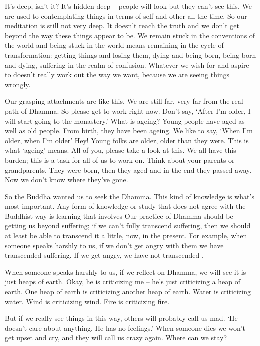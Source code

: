 It's deep, isn't it? It's hidden deep -- people will look but they can't see this. We are used to contemplating things in terms of self and other all the time. So our meditation is still not very deep. It doesn't reach the truth and we don't get beyond the way these things appear to be. We remain stuck in the conventions of the world and being stuck in the world means remaining in the cycle of transformation: getting things and losing them, dying and being born, being born and dying, suffering in the realm of confusion. Whatever we wish for and aspire to doesn't really work out the way we want, because we are seeing things wrongly.

Our grasping attachments are like this. We are still far, very far from the real path of Dhamma. So please get to work right now. Don't say, `After I'm older, I will start going to the monastery.' What is ageing? Young people have aged as well as old people. From birth, they have been ageing. We like to say, `When I'm older, when I'm older' Hey! Young folks are older, older than they were. This is what `ageing' means. All of you, please take a look at this. We all have this burden; this is a task for all of us to work on. Think about your parents or grandparents. They were born, then they aged and in the end they passed away. Now we don't know where they've gone.

So the Buddha wanted us to seek the Dhamma. This kind of knowledge is what's most important. Any form of knowledge or study that does not agree with the Buddhist way is learning that involves  Our practice of Dhamma should be getting us beyond suffering; if we can't fully transcend suffering, then we should at least be able to transcend it a little, now, in the present. For example, when someone speaks harshly to us, if we don't get angry with them we have transcended suffering. If we get angry, we have not transcended .

When someone speaks harshly to us, if we reflect on Dhamma, we will see it is just heaps of earth. Okay, he is criticizing me -- he's just criticizing a heap of earth. One heap of earth is criticizing another heap of earth. Water is criticizing water. Wind is criticizing wind. Fire is criticizing fire.

But if we really see things in this way, others will probably call us mad. `He doesn't care about anything. He has no feelings.' When someone dies we won't get upset and cry, and they will call us crazy again. Where can we stay?

